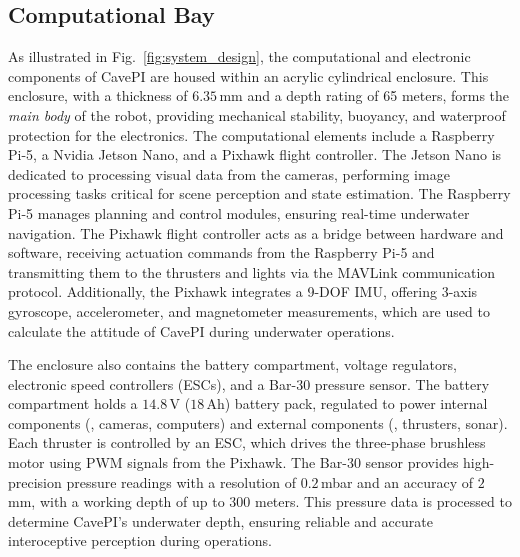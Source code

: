 \subsection{Computational Bay}
\vspace{-1 mm}
As illustrated in Fig.~\ref{fig:system_design}, the computational and electronic components of CavePI are housed within an acrylic cylindrical enclosure. This enclosure, with a thickness of $6.35$\,mm and a depth rating of 65 meters, forms the \textit{main body} of the robot, providing mechanical stability, buoyancy, and waterproof protection for the electronics. The computational elements include a Raspberry Pi-5, a Nvidia\texttrademark{} Jetson Nano, and a Pixhawk\texttrademark{} flight controller. The Jetson Nano is dedicated to processing visual data from the cameras, performing image processing tasks critical for scene perception and state estimation. The Raspberry Pi-5 manages planning and control modules, ensuring real-time underwater navigation. The Pixhawk flight controller acts as a bridge between hardware and software, receiving actuation commands from the Raspberry Pi-5 and transmitting them to the thrusters and lights via the MAVLink communication protocol. Additionally, the Pixhawk integrates a 9-DOF IMU, offering 3-axis gyroscope, accelerometer, and magnetometer measurements, which are used to calculate the attitude of CavePI during underwater operations.

The enclosure also contains the battery compartment, voltage regulators, electronic speed controllers (ESCs), and a Bar-30 pressure sensor. The battery compartment holds a $14.8$\,V ($18$\,Ah) battery pack, regulated to power internal components (\eg, cameras, computers) and external components (\eg, thrusters, sonar). Each thruster is controlled by an ESC, which drives the three-phase brushless motor using PWM signals from the Pixhawk. The Bar-30 sensor provides high-precision pressure readings with a resolution of $0.2$\,mbar and an accuracy of $2$\,mm, with a working depth of up to $300$ meters. This pressure data is processed to determine CavePI’s underwater depth, ensuring reliable and accurate interoceptive perception during operations.




